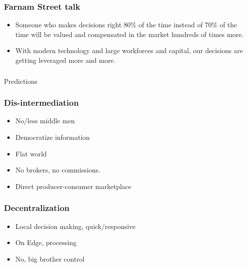 \begin{frame}[fragile]\frametitle{Farnam Street talk}

\begin{itemize}
\item Someone who makes decisions right 80\% of the time instead of 70\% of the time will be valued and compensated in the market hundreds of times more. 
\item With modern technology and large workforces and capital, our decisions are getting leveraged more and more.
\end{itemize}

\end{frame}

\begin{frame}[fragile]\frametitle{}
\begin{center}
{\Large Predictions}

\end{center}
\end{frame}

\begin{frame}[fragile]\frametitle{Dis-intermediation}

\begin{itemize}
\item No/less middle men
\item Democratize information
\item Flat world
\item No brokers, no commissions.
\item Direct producer-consumer marketplace
\end{itemize}

\end{frame}


\begin{frame}[fragile]\frametitle{Decentralization}

\begin{itemize}
\item Local decision making, quick/responsive
\item On Edge, processing
\item No, big brother control
\end{itemize}

\end{frame}

